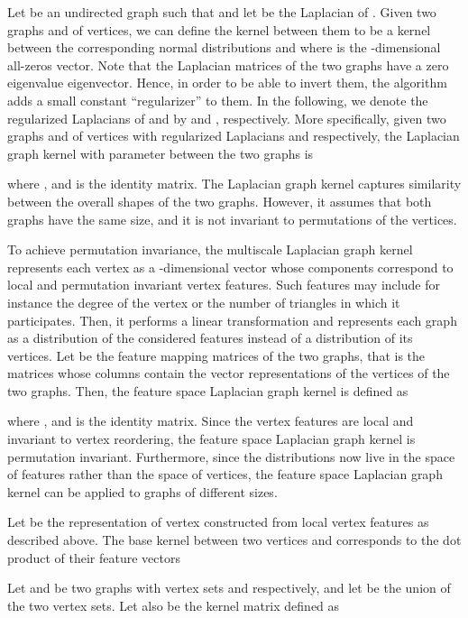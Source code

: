 \documentclass[twoside,11pt]{article}
\begin{document}
Let  be an undirected graph such that  and let  be the Laplacian of .
Given two graphs  and  of  vertices, we can define the kernel between them to be a kernel between the corresponding normal distributions  and  where  is the -dimensional all-zeros vector.
Note that the Laplacian matrices of the two graphs have a zero eigenvalue eigenvector.
Hence, in order to be able to invert them, the algorithm adds a small constant ``regularizer''  to them.
In the following, we denote the regularized Laplacians of  and  by  and , respectively.
More specifically, given two graphs  and  of  vertices with regularized Laplacians  and  respectively, the Laplacian graph kernel with parameter  between the two graphs is

where ,  and  is the  identity matrix.
The Laplacian graph kernel captures similarity between the overall shapes of the two graphs.
However, it assumes that both graphs have the same size, and it is not invariant to permutations of the vertices.

To achieve permutation invariance, the multiscale Laplacian graph kernel represents each vertex as a -dimensional vector whose components correspond to local and permutation invariant vertex features.
Such features may include for instance the degree of the vertex or the number of triangles in which it participates.
Then, it performs a linear transformation and represents each graph as a distribution of the considered features instead of a distribution of its vertices.
Let  be the feature mapping matrices of the two graphs, that is the matrices whose columns contain the vector representations of the vertices of the two graphs. 
Then, the feature space Laplacian graph kernel is defined as

where ,  and  is the  identity matrix.
Since the vertex features are local and invariant to vertex reordering, the feature space Laplacian graph kernel is permutation invariant.
Furthermore, since the distributions now live in the space of features rather than the space of vertices, the feature space Laplacian graph kernel can be applied to graphs of different sizes.

Let  be the representation of vertex  constructed from local vertex features as described above.
The base kernel  between two vertices  and  corresponds to the dot product of their feature vectors

Let  and  be two graphs with vertex sets  and  respectively, and let  be the union of the two vertex sets.
Let also  be the kernel matrix defined as
\end{document}
